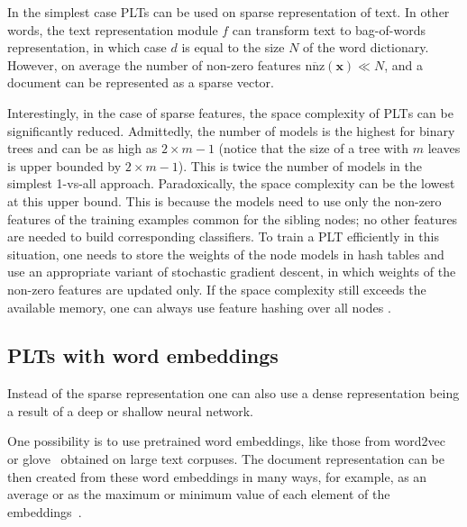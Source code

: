 \documentclass{article}
\newcommand{\Algo}[1]{\textsc{#1}}
\renewcommand{\vec}[1]{\boldsymbol{#1}}
\newcommand{\bx}{\vec{x}}
\newcommand{\sectionBefore}{-0pt}
\newcommand{\sectionAfter}{-0pt}
\begin{document}
In the simplest case PLTs can be used on sparse representation of text. In other words, the text representation module $f$ can transform text to bag-of-words representation, in which case $d$ is equal to the size $N$ of the word dictionary. However, on average the number of non-zero features $\overline{\mathrm{nnz}}(\bx) \ll N$, and a document can be represented as a sparse vector. 

Interestingly, in the case of sparse features, the space complexity of \Algo{PLT}s can be significantly reduced. Admittedly, the number of models is the highest for binary trees and can be as high as $2\times m-1$ (notice that the size of a tree with $m$ leaves is upper bounded by $2\times m-1$). This is twice the number of models in the simplest 1-vs-all approach. Paradoxically, the space complexity can be the lowest at this upper bound. This is because the models need to use only the non-zero features of the training examples common for the sibling nodes; no other features are needed to build corresponding classifiers. To train a \Algo{PLT} efficiently in this situation, one needs to store the weights of the node models in hash tables and use an appropriate variant of stochastic gradient descent, in which weights of the non-zero features are updated only. If the space complexity still exceeds the available memory, one can always use feature hashing over all nodes \cite{Weinberger_et_al_2009}.


\vspace{\sectionBefore}
\subsection{PLTs with word embeddings}
\label{sec:plt-word_embeddings}
\vspace{\sectionAfter}

Instead of the sparse representation one can also use a dense representation being a result of a deep or shallow neural network. %

One possibility is to use pretrained word embeddings, like those from word2vec~\citep{Mikolov_et_al_2013} or glove~\citep{Pennigton_et_al_2014} obtained on large text corpuses. The document representation can be then created from these word embeddings in many ways, for example, as an average or as the maximum or minimum value of each element of the embeddings~\citep{De_Boom_et_al_2016}.
\end{document}

